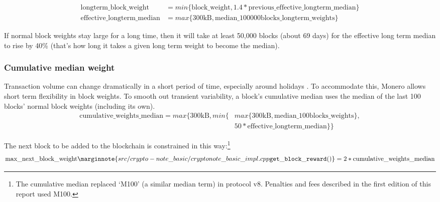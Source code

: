 \begin{align*}
    \textrm{longterm\_block\_weight} &= min\{\textrm{block\_weight}, 1.4*\textrm{previous\_effective\_longterm\_median}\}\\
    \textrm{effective\_longterm\_median} &= max\{\textrm{300kB}, \textrm{median\_100000blocks\_longterm\_weights}\}%
\end{align*}{}

If normal block weights stay large for a long time, then it will take at least 50,000 blocks (about 69 days) for the effective long term median to rise by 40\% (that's how long it takes a given long term weight to become the median).

\subsubsection*{Cumulative median weight}

Transaction volume can change dramatically in a short period of time, especially around holidays \cite{visa-seasonality}. To accommodate this, Monero allows short term flexibility in block weights. To smooth out transient variability, a block's cumulative median uses the median of the last 100 blocks' normal block weights (including its own).\vspace{.1cm}
\begin{align*}
    \textrm{cumulative\_weights\_median} = max\{\textrm{300kB}, min\{&max\{\textrm{300kB}, \textrm{median\_100blocks\_weights}\},\\
    &50*\textrm{effective\_longterm\_median}\}\}%
\end{align*}{}

The next block to be added to the blockchain is constrained in this way:\footnote{The cumulative median replaced `M100' (a similar median term) in protocol v8. Penalties and fees described in the first edition of this report \cite{ztm-1} used M100.}\vspace{.1cm}
\[\textrm{max\_next\_block\_weight}\marginnote{src/crypto- note\_basic/ cryptonote\_ basic\_ impl.cpp {\tt get\_block\_ reward()}} = 2*\textrm{cumulative\_weights\_median}\]%

